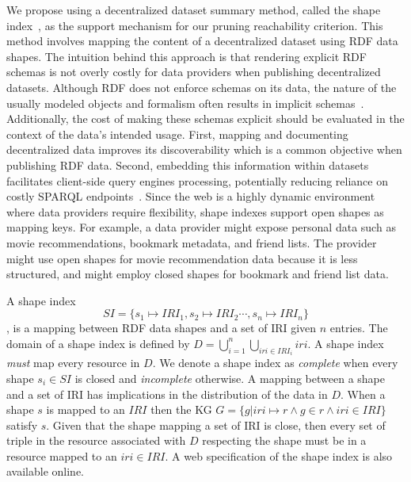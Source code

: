We propose using a decentralized dataset summary method, called the shape index~\cite{tam2024opportunitiesshapebasedoptimizationlink}, as the support mechanism for our pruning reachability criterion.
This method involves mapping the content of a decentralized dataset using RDF data shapes.
The intuition behind this approach is that rendering explicit RDF schemas is not overly costly for data providers when publishing decentralized datasets.
Although RDF does not enforce schemas on its data, the nature of the usually modeled objects and formalism often results in implicit schemas~\cite{Neumann2011CharacteristicSA}.
Additionally, the cost of making these schemas explicit should be evaluated in the context of the data's intended usage.
First, mapping and documenting decentralized data improves its discoverability which is a common objective when publishing RDF data.
Second, embedding this information within datasets facilitates client-side query engines processing, potentially reducing reliance on costly SPARQL endpoints~\cite{aranda2013}.
Since the web is a highly dynamic environment where data providers require flexibility, shape indexes support open shapes as mapping keys.
For example, a data provider might expose personal data such as movie recommendations, bookmark metadata, and friend lists.
The provider might use open shapes for movie recommendation data because it is less structured, and might employ closed shapes for bookmark and friend list data.

A shape index 
\begin{equation}\label{eq:shapeIndex}
   SI = \{s_1 \mapsto IRI_1, s_2 \mapsto IRI_2 \cdots, s_n \mapsto IRI_n\}
\end{equation}
, is a mapping between RDF data shapes and a set of IRI given $n$ entries.
The domain of a shape index is defined by $D = \bigcup_{i=1}^{n} \bigcup_{iri \in IRI_i} iri$.
A shape index \emph{must} map every resource in $D$.
We denote a shape index as \emph{complete} when every shape $s_i \in SI$ is closed and \emph{incomplete} otherwise.
A mapping between a shape and a set of IRI has implications in the distribution of the data in $D$.
When a shape $s$ is mapped to an $IRI$ then the KG $G = \{g | iri \mapsto r \land g \in r \land iri \in IRI\}$ satisfy $s$.
Given that the shape mapping a set of IRI is close, then every set of triple in the resource associated with $D$ respecting the shape must be in a resource mapped to an $iri \in IRI$.
A web specification of the shape index is also available online.~

